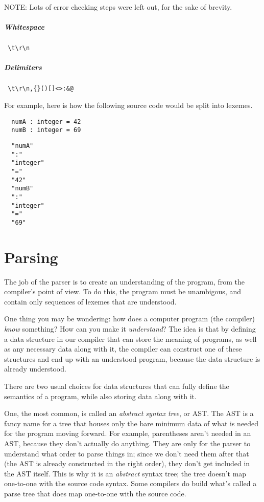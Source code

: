 \documentclass[
12pt,
letterpaper,
oneside,
]{memoir}
\begin{document}
NOTE: Lots of error checking steps were left out, for the sake of brevity.

\paragraph{Whitespace} \verb| \t\r\n|

\paragraph{Delimiters} \verb| \t\r\n,{}()[]<>:&@|

\filbreak

For example, here is how the following source code would be split into lexemes.

\begin{verbatim}
  numA : integer = 42
  numB : integer = 69
\end{verbatim}

\begin{verbatim}
  "numA"
  ":"
  "integer"
  "="
  "42"
  "numB"
  ":"
  "integer"
  "="
  "69"
\end{verbatim}

\chapter{Parsing}

The job of the parser is to create an understanding of the program, from the compiler's point of view. To do this, the program must be unambigous, and contain only sequences of lexemes that are understood.

One thing you may be wondering: how does a computer program (the compiler) \emph{know} something? How can you make it \emph{understand}? The idea is that by defining a data structure in our compiler that can store the meaning of programs, as well as any necessary data along with it, the compiler can construct one of these structures and end up with an understood program, because the data structure is already understood.

There are two usual choices for data structures that can fully define the semantics of a program, while also storing data along with it.

One, the most common, is called an \emph{abstract syntax tree}, or AST. The AST is a fancy name for a tree that houses only the bare minimum data of what is needed for the program moving forward. For example, parentheses aren't needed in an AST, because they don't actually do anything. They are only for the parser to understand what order to parse things in; since we don't need them after that (the AST is already constructed in the right order), they don't get included in the AST itself. This is why it is an \emph{abstract} syntax tree; the tree doesn't map one-to-one with the source code syntax. Some compilers do build what's called a parse tree that does map one-to-one with the source code.
\end{document}
